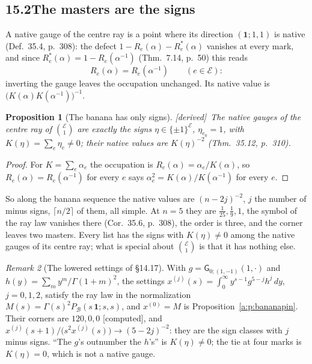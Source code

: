 \documentclass[11pt]{article}
\newcommand{\cE}{\mathcal E}
\newcommand{\cB}{\mathcal B}
\newcommand{\one}{\mathbf 1}
\newcommand{\sG}{\mathsf G}
\newcommand{\Pc}[1]{P_{\cB}(#1\,\one;#1,#1)}
\theoremstyle{plain}
\newtheorem{proposition}{Proposition}[section]
\theoremstyle{definition}
\theoremstyle{remark}
\newtheorem{remark}[proposition]{Remark}
\newcommand{\derived}{\textup{[derived]}}
\newcommand{\computed}{\textup{[computed]}}
\begin{document}
\subsection*{15.2\quad The masters are the signs}

A native gauge of the centre ray is a point where its direction $(\one;1,1)$ is native (Def.~35.4, p.~308): the defect $1-R_e(\alpha)-R^\ast_e(\alpha)$ vanishes at every mark, and since $R^\ast_e(\alpha)=1-R_e(\alpha^{-1})$ (Thm.~7.14, p.~50) this reads
\[
R_e(\alpha)=R_e(\alpha^{-1})\qquad(e\in\cE):
\]
inverting the gauge leaves the occupation unchanged. Its native value is $\big(K(\alpha)K(\alpha^{-1})\big)^{-1}$.

\begin{proposition}[The banana has only signs]\label{a:p:onlysigns}\derived\
The native gauges of the centre ray of $\binom{\cE}1$ are exactly the signs $\eta\in\{\pm1\}^{\cE}$, $\eta_{e_0}=1$, with $K(\eta)=\sum_e\eta_e\neq0$; their native values are $K(\eta)^{-2}$ (Thm.~35.12, p.~310).
\end{proposition}

\begin{proof}
For $K=\sum_e\alpha_e$ the occupation is $R_e(\alpha)=\alpha_e/K(\alpha)$, so $R_e(\alpha)=R_e(\alpha^{-1})$ for every $e$ says $\alpha_e^2=K(\alpha)/K(\alpha^{-1})$ for every $e$.
\end{proof}

So along the banana sequence the native values are $(n-2j)^{-2}$, $j$ the number of minus signs, $\lceil n/2\rceil$ of them, all simple. At $n=5$ they are $\frac1{25},\frac19,1$, the symbol of the ray law vanishes there (Cor.~35.6, p.~308), the order is three, and the corner leaves two masters. Every list has the signs with $K(\eta)\neq0$ among the native gauges of its centre ray; what is special about $\binom{\cE}1$ is that it has nothing else.

\begin{remark}[The lowered settings of \S14.17]\label{a:r:lowered}
With $g=\sG_{0;(1,-1)}(1,\cdot)$ and $h(y)=\sum_my^m/\Gamma(1+m)^2$, the settings $x^{(j)}(s)=\int_0^\infty y^{s-1}g^{5-j}h^j\,dy$, $j=0,1,2$, satisfy the ray law in the normalization $M(s)=\Gamma(s)^2\Pc s$, and $x^{(0)}=M$ is Proposition~\ref{a:p:bananapin}. Their corners are $120,0,0$ \computed, and $x^{(j)}(s+1)/\big(s^2x^{(j)}(s)\big)\to(5-2j)^{-2}$: they are the sign classes with $j$ minus signs. ``The $g$'s outnumber the $h$'s'' is $K(\eta)\neq0$; the tie at four marks is $K(\eta)=0$, which is not a native gauge.
\end{remark}
\end{document}
